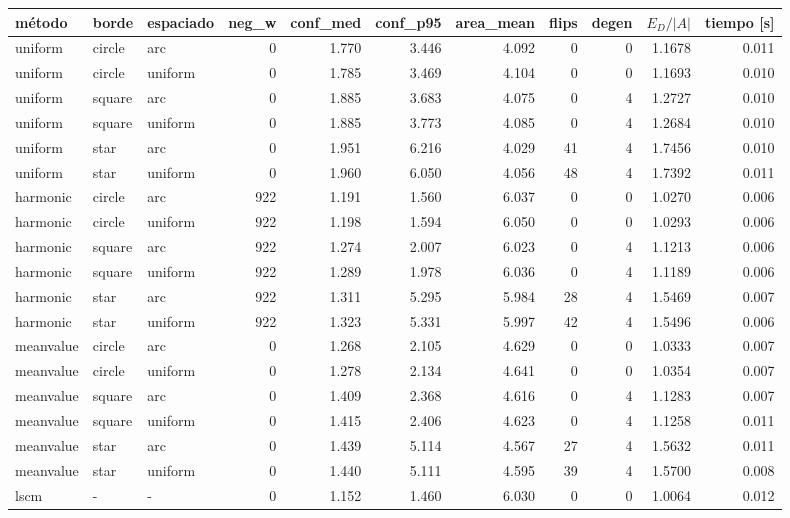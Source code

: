 \begin{tabular}{lllrrrrrrrr}
\toprule
método & borde & espaciado & neg\_w & conf\_med & conf\_p95 & area\_mean & flips & degen & $E_D/|A|$ & tiempo [s] \\
\midrule
uniform & circle & arc & 0 & 1.770 & 3.446 & 4.092 & 0 & 0 & 1.1678 & 0.011 \\
uniform & circle & uniform & 0 & 1.785 & 3.469 & 4.104 & 0 & 0 & 1.1693 & 0.010 \\
uniform & square & arc & 0 & 1.885 & 3.683 & 4.075 & 0 & 4 & 1.2727 & 0.010 \\
uniform & square & uniform & 0 & 1.885 & 3.773 & 4.085 & 0 & 4 & 1.2684 & 0.010 \\
uniform & star & arc & 0 & 1.951 & 6.216 & 4.029 & 41 & 4 & 1.7456 & 0.010 \\
uniform & star & uniform & 0 & 1.960 & 6.050 & 4.056 & 48 & 4 & 1.7392 & 0.011 \\
\midrule
harmonic & circle & arc & 922 & 1.191 & 1.560 & 6.037 & 0 & 0 & 1.0270 & 0.006 \\
harmonic & circle & uniform & 922 & 1.198 & 1.594 & 6.050 & 0 & 0 & 1.0293 & 0.006 \\
harmonic & square & arc & 922 & 1.274 & 2.007 & 6.023 & 0 & 4 & 1.1213 & 0.006 \\
harmonic & square & uniform & 922 & 1.289 & 1.978 & 6.036 & 0 & 4 & 1.1189 & 0.006 \\
harmonic & star & arc & 922 & 1.311 & 5.295 & 5.984 & 28 & 4 & 1.5469 & 0.007 \\
harmonic & star & uniform & 922 & 1.323 & 5.331 & 5.997 & 42 & 4 & 1.5496 & 0.006 \\
\midrule
meanvalue & circle & arc & 0 & 1.268 & 2.105 & 4.629 & 0 & 0 & 1.0333 & 0.007 \\
meanvalue & circle & uniform & 0 & 1.278 & 2.134 & 4.641 & 0 & 0 & 1.0354 & 0.007 \\
meanvalue & square & arc & 0 & 1.409 & 2.368 & 4.616 & 0 & 4 & 1.1283 & 0.007 \\
meanvalue & square & uniform & 0 & 1.415 & 2.406 & 4.623 & 0 & 4 & 1.1258 & 0.011 \\
meanvalue & star & arc & 0 & 1.439 & 5.114 & 4.567 & 27 & 4 & 1.5632 & 0.011 \\
meanvalue & star & uniform & 0 & 1.440 & 5.111 & 4.595 & 39 & 4 & 1.5700 & 0.008 \\
\midrule
lscm & - & - & 0 & 1.152 & 1.460 & 6.030 & 0 & 0 & 1.0064 & 0.012 \\
\bottomrule
\end{tabular}
